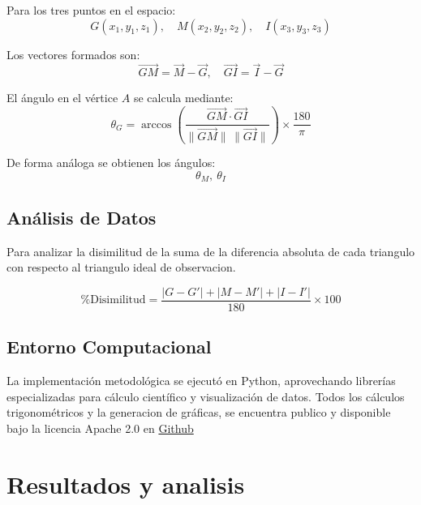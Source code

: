 \documentclass[a4paper,alpha-refs]{eSpectra}
\begin{document}
Para los tres puntos en el espacio:
\[
G(x_1, y_1, z_1), \quad M(x_2, y_2, z_2), \quad I(x_3, y_3, z_3)
\]

Los vectores formados son:
\[
\vec{GM} = \vec{M} - \vec{G}, \quad
\vec{GI} = \vec{I} - \vec{G}
\]

El ángulo en el vértice \(A\) se calcula mediante:
\[
\theta_G = \arccos \left(
\frac{ \vec{GM} \cdot \vec{GI} }{ \lVert \vec{GM} \rVert \, \lVert \vec{GI} \rVert }
\right) \times \frac{180}{\pi}
\]

De forma análoga se obtienen los ángulos:
\[
\theta_M, \ \theta_I
\]
\vspace{-\baselineskip}  %
\vspace{-0.5\baselineskip}  %

\subsection{Análisis de Datos }

Para analizar la disimilitud de la suma de la diferencia absoluta de cada triangulo con respecto al triangulo ideal de observacion. 


\begin{equation}
\% \text{Disimilitud} = 
\frac{ \left| G - G' \right| + \left| M - M' \right| + \left| I - I' \right| }{180} \times 100
\label{eq:dissimilarity}
\end{equation}

\subsection{Entorno Computacional}
La implementación metodológica se ejecutó en Python, aprovechando librerías especializadas para cálculo científico y visualización de datos. Todos los cálculos trigonométricos y la generacion de gráficas, se encuentra publico y disponible bajo la licencia Apache 2.0 en \href{https://github.com/Usuy-Leon/El-secreto-astronomico-de-Guadalupe-Monserrate}{Github}








\section{Resultados y analisis}
\end{document}
